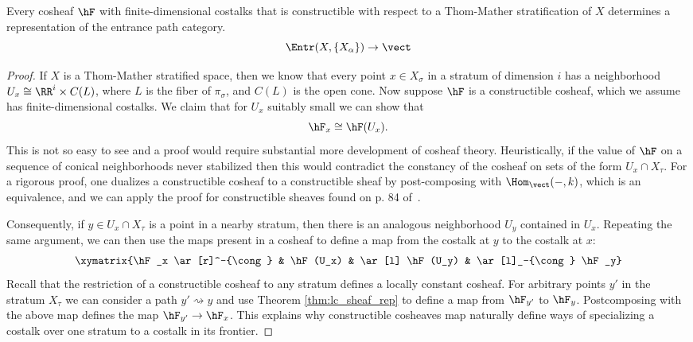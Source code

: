 \begin{thm}
	Every cosheaf $\hF$ with finite-dimensional costalks that is constructible with respect to a Thom-Mather stratification of $X$ determines a representation of the entrance path category.
	\[
		\Entr(X,\{X_{\alpha}\}) \to \vect
	\]
\end{thm}
\begin{proof}
	If $X$ is a Thom-Mather stratified space, then we know that every point $x\in X_{\sigma}$ in a stratum of dimension $i$ has a neighborhood $U_x\cong \RR^i\times C(L)$, where $L$ is the fiber of $\pi_{\sigma}$, and $C(L)$ is the open cone. Now suppose $\hF$ is a constructible cosheaf, which we assume has finite-dimensional costalks. We claim that for $U_x$ suitably small we can show that
	\[
		\hF_x\cong \hF(U_x).
	\]
	This is not so easy to see and a proof would require substantial more development of cosheaf theory. Heuristically, if the value of $\hF$ on a sequence of conical neighborhoods never stabilized then this would contradict the constancy of the cosheaf on sets of the form $U_x\cap X_{\tau}$. For a rigorous proof, one dualizes a constructible cosheaf to a constructible sheaf by post-composing with $\Hom_{\vect}(-,k)$, which is an equivalence, and we can apply the proof for constructible sheaves found on p. 84 of~\cite{gm-ih2}. 
	
	Consequently, if $y\in U_x\cap X_{\tau}$ is a point in a nearby stratum, then there is an analogous neighborhood $U_y$ contained in $U_x$. Repeating the same argument, we can then use the maps present in a cosheaf to define a map from the costalk at $y$ to the costalk at $x$:
	\[
		\xymatrix{\hF_x \ar[r]^-{\cong} & \hF(U_x) & \ar[l] \hF(U_y) & \ar[l]_-{\cong} \hF_y}
	\]
	Recall that the restriction of a constructible cosheaf to any stratum defines a locally constant cosheaf. For arbitrary points $y'$ in the stratum $X_{\tau}$ we can consider a path $y'\rightsquigarrow y$ and use Theorem \ref{thm:lc_sheaf_rep} to define a map from $\hF_{y'}$ to $\hF_{y}$. Postcomposing with the above map defines the map $\hF_{y'}\to \hF_{x}$. This explains why constructible cosheaves map naturally define ways of specializing a costalk over one stratum to a costalk in its frontier.


\end{proof}
